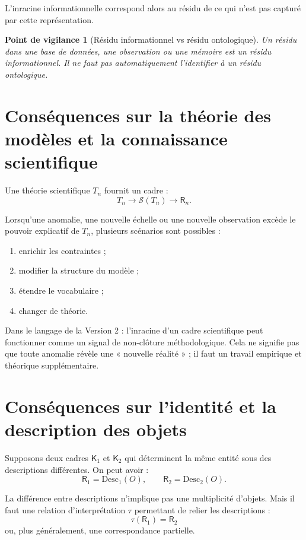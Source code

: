 \documentclass[11pt,a4paper]{article}
\newtheorem{warning}{Point de vigilance}[section]
\newcommand{\Rac}{\mathsf{R}}
\newcommand{\Cadre}{\mathsf{K}}
\newcommand{\Sol}{\mathcal{S}}
\begin{document}
L'inracine informationnelle correspond alors au résidu de ce qui n'est pas
capturé par cette représentation.

\begin{warning}[Résidu informationnel vs résidu ontologique]
Un résidu dans une base de données, une observation ou une mémoire est un
résidu informationnel. Il ne faut pas automatiquement l'identifier à un
résidu ontologique.
\end{warning}

\section{Conséquences sur la théorie des modèles et la connaissance scientifique}

Une théorie scientifique \(T_n\) fournit un cadre :
\[
T_n\to\Sol(T_n)\to\Rac_n.
\]

Lorsqu'une anomalie, une nouvelle échelle ou une nouvelle observation excède
le pouvoir explicatif de \(T_n\), plusieurs scénarios sont possibles :
\begin{enumerate}
    \item enrichir les contraintes ;
    \item modifier la structure du modèle ;
    \item étendre le vocabulaire ;
    \item changer de théorie.
\end{enumerate}

Dans le langage de la Version 2 : l'inracine d'un cadre scientifique peut
fonctionner comme un signal de non-clôture méthodologique. Cela ne signifie
pas que toute anomalie révèle une « nouvelle réalité » ; il faut un travail
empirique et théorique supplémentaire.

\section{Conséquences sur l'identité et la description des objets}

Supposons deux cadres \(\Cadre_1\) et \(\Cadre_2\) qui déterminent la même
entité sous des descriptions différentes. On peut avoir :
\[
\Rac_1=\mathrm{Desc}_1(O),
\qquad
\Rac_2=\mathrm{Desc}_2(O).
\]

La différence entre descriptions n'implique pas une multiplicité d'objets.
Mais il faut une relation d'interprétation \(\tau\) permettant de relier les
descriptions :
\[
\tau(\Rac_1)=\Rac_2
\]
ou, plus généralement, une correspondance partielle.
\end{document}
